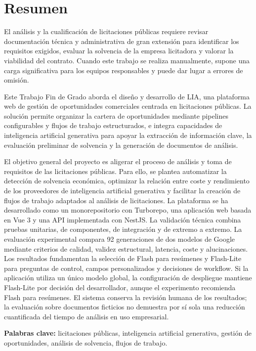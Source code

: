 \cleardoublepage
{}
\chapter*{Resumen}
\label{front:resumen}

El análisis y la cualificación de licitaciones públicas requiere revisar
documentación técnica y administrativa de gran extensión para identificar los
requisitos exigidos, evaluar la solvencia de la empresa licitadora y valorar la
viabilidad del contrato. Cuando este trabajo se realiza manualmente, supone una
carga significativa para los equipos responsables y puede dar lugar a errores
de omisión.

Este Trabajo Fin de Grado aborda el diseño y desarrollo de LIA, una plataforma
web de gestión de oportunidades comerciales centrada en licitaciones públicas.
La solución permite organizar la cartera de oportunidades mediante pipelines
configurables y flujos de trabajo estructurados, e integra capacidades de
inteligencia artificial generativa para apoyar la extracción de información
clave, la evaluación preliminar de solvencia y la generación de documentos de
análisis.

El objetivo general del proyecto es aligerar el proceso de análisis y toma de
requisitos de las licitaciones públicas. Para ello, se plantea automatizar la
detección de solvencia económica, optimizar la relación entre coste y
rendimiento de los proveedores de inteligencia artificial generativa y
facilitar la creación de flujos de trabajo adaptados al análisis de
licitaciones. La plataforma se ha desarrollado como un monorepositorio con
Turborepo, una aplicación web basada en Vue 3 y una API implementada con
NestJS. La validación técnica combina pruebas unitarias, de componentes, de
integración y de extremo a extremo. La evaluación experimental compara 92
generaciones de dos modelos de Google mediante criterios de calidad, validez
estructural, latencia, coste y alucinaciones. Los resultados fundamentan la
selección de Flash para resúmenes y Flash-Lite para preguntas de control,
campos personalizados y decisiones de workflow. Si la aplicación utiliza un
único modelo global, la configuración de despliegue mantiene Flash-Lite por
decisión del desarrollador, aunque el experimento recomienda Flash para
resúmenes. El sistema conserva la revisión humana
de los resultados; la evaluación sobre documentos ficticios no demuestra por
sí sola una reducción cuantificada del tiempo de análisis en uso empresarial.

\vspace{0.5cm}
\noindent\textbf{Palabras clave:} licitaciones públicas, inteligencia
artificial generativa, gestión de oportunidades, análisis de solvencia,
flujos de trabajo.
